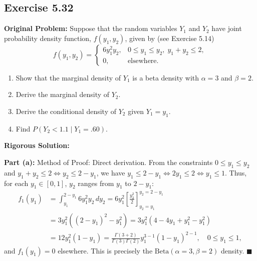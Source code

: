 \documentclass[11pt, letterpaper]{article}
\theoremstyle{definition}
\theoremstyle{remark}
\begin{document}
\subsection{Exercise 5.32}

\textbf{Original Problem:}
Suppose that the random variables $Y_1$ and $Y_2$ have joint probability density function, $f(y_1, y_2)$, given by (see Exercise 5.14)
\[ f(y_1, y_2) = \begin{cases} 6y_1^2 y_2, & 0 \le y_1 \le y_2, \; y_1 + y_2 \le 2, \\ 0, & \text{elsewhere.} \end{cases} \]
\begin{enumerate}[label=\textbf{\alph*}]
    \item Show that the marginal density of $Y_1$ is a beta density with $\alpha = 3$ and $\beta = 2$.
    \item Derive the marginal density of $Y_2$.
    \item Derive the conditional density of $Y_2$ given $Y_1 = y_1$.
    \item Find $P(Y_2 < 1.1 \mid Y_1 = .60)$.
\end{enumerate}

\textbf{Rigorous Solution:}

\textbf{Part (a):} Method of Proof: Direct derivation.
From the constraints $0 \le y_1 \le y_2$ and $y_1 + y_2 \le 2 \iff y_2 \le 2 - y_1$, we have $y_1 \le 2 - y_1 \iff 2y_1 \le 2 \iff y_1 \le 1$. Thus, for each $y_1 \in [0, 1]$, $y_2$ ranges from $y_1$ to $2 - y_1$:
\begin{align*}
    f_1(y_1) &= \int_{y_1}^{2 - y_1} 6y_1^2 y_2 \, dy_2 = 6y_1^2 \left[ \frac{y_2^2}{2} \right]_{y_2=y_1}^{y_2=2-y_1} \\
    &= 3y_1^2 \left( (2 - y_1)^2 - y_1^2 \right) = 3y_1^2 (4 - 4y_1 + y_1^2 - y_1^2) \\
    &= 12y_1^2(1 - y_1) = \frac{\Gamma(3 + 2)}{\Gamma(3)\Gamma(2)} y_1^{3-1}(1 - y_1)^{2-1}, \quad 0 \le y_1 \le 1,
\end{align*}
and $f_1(y_1) = 0$ elsewhere. This is precisely the $\text{Beta}(\alpha = 3, \beta = 2)$ density. $\blacksquare$
\end{document}
